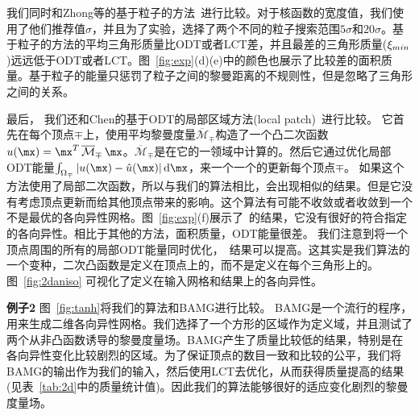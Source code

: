 我们同时和Zhong等的基于粒子的方法~\cite{Zhong2013}进行比较。对于核函数的宽度值，我们使用了他们推荐值$\sigma$，并且为了实验，选择了两个不同的粒子搜索范围$5\sigma$和$20\sigma$。基于粒子的方法的平均三角形质量比ODT或者LCT差，并且最差的三角形质量($\xi_{min}$)远远低于ODT或者LCT。图~\ref{fig:exp}(d)(e)中的颜色也展示了比较差的面积质量。基于粒子的能量只惩罚了粒子之间的黎曼距离的不规则性，但是忽略了三角形之间的关系。

最后， 我们还和Chen的基于ODT的局部区域方法(local patch)~\cite{Chen2004a}进行比较。 它首先在每个顶点$\mp$上，使用平均黎曼度量$\overline{\mathcal{M}}_\mp$构造了一个凸二次函数$u(\mx) = \mx^T \, \overline{\mathcal{M}}_{\mp} \, \mx$。$\overline{\mathcal{M}}_\mp$是在它的一领域中计算的。然后它通过优化局部ODT能量$\int_{\Omega_{\mp}} |u(\mx)-\hat{u}(\mx)|\, \mathrm{d} \mx$，来一个一个的更新每个顶点$\mp$。 如果这个方法使用了局部二次函数，所以与我们的算法相比，会出现相似的结果。但是它没有考虑顶点更新而给其他顶点带来的影响。这个算法有可能不收敛或者收敛到一个不是最优的各向异性网格。图~\ref{fig:exp}(f)展示了~\cite{Chen2004a}的结果，它没有很好的符合指定的各向异性。相比于其他的方法，面积质量，ODT能量很差。 我们注意到将一个顶点周围的所有的局部ODT能量同时优化，~\cite{Chen2004a}结果可以提高。这其实是我们算法的一个变种，二次凸函数是定义在顶点上的，而不是定义在每个三角形上的。
图~\ref{fig:2daniso} 可视化了定义在输入网格和结果上的各向异性。

\textbf{例子2}\quad
图~\ref{fig:tanh}将我们的算法和BAMG进行比较。 BAMG是一个流行的程序，用来生成二维各向异性网格。我们选择了一个方形的区域作为定义域，并且测试了两个从非凸函数诱导的黎曼度量场。BAMG产生了质量比较低的结果，特别是在各向异性变化比较剧烈的区域。为了保证顶点的数目一致和比较的公平，我们将BAMG的输出作为我们的输入，然后使用LCT去优化，从而获得质量提高的结果(见表~\ref{tab:2d}中的质量统计值)。因此我们的算法能够很好的适应变化剧烈的黎曼度量场。

